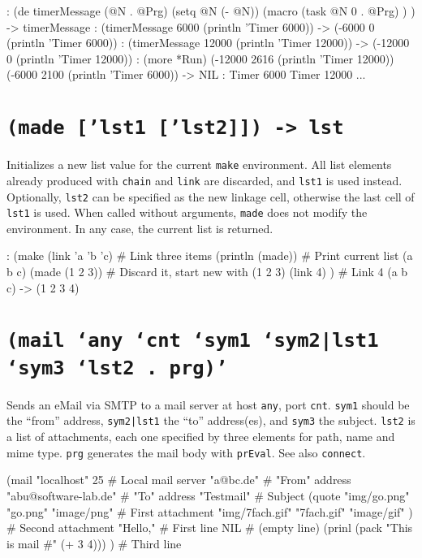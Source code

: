 \begin{wideverbatim}
: (de timerMessage (@N . @Prg)
   (setq @N (- @N))
   (macro
      (task @N 0 . @Prg) ) )
-> timerMessage
: (timerMessage 6000 (println 'Timer 6000))
-> (-6000 0 (println 'Timer 6000))
: (timerMessage 12000 (println 'Timer 12000))
-> (-12000 0 (println 'Timer 12000))
: (more *Run)
(-12000 2616 (println 'Timer 12000))
(-6000 2100 (println 'Timer 6000))
-> NIL
: Timer 6000
Timer 12000
...
\end{wideverbatim}

 
\section*{\texttt{(made ['lst1 ['lst2]]) -> lst}}
\label{sec:func-ref-M-(made ['lst1 ['lst2]]) -> lst}


Initializes a new list value for the current \texttt{make} environment. All
list elements already produced with \texttt{chain} and \texttt{link} are discarded,
and \texttt{lst1} is used instead. Optionally, \texttt{lst2} can be specified as the
new linkage cell, otherwise the last cell of \texttt{lst1} is used. When called
without arguments, \texttt{made} does not modify the environment. In any case,
the current list is returned.


\begin{wideverbatim}
: (make
   (link 'a 'b 'c)         # Link three items
   (println (made))        # Print current list (a b c)
   (made (1 2 3))          # Discard it, start new with (1 2 3)
   (link 4) )              # Link 4
(a b c)
-> (1 2 3 4)
\end{wideverbatim}

 
\section*{\texttt{(mail `any `cnt `sym1 `sym2|lst1 `sym3 `lst2 . prg)'}}
\label{sec:func-ref-M-(mail `any `cnt `sym1 `sym2|lst1 `sym3 `lst2 . prg)'}

Sends an eMail via SMTP to a mail server at host \texttt{any}, port \texttt{cnt}.
\texttt{sym1} should be the ``from'' address, \texttt{sym2|lst1} the ``to'' address(es),
and \texttt{sym3} the subject. \texttt{lst2} is a list of attachments, each one
specified by three elements for path, name and mime type. \texttt{prg}
generates the mail body with \texttt{prEval}. See also \texttt{connect}.


\begin{wideverbatim}
(mail "localhost" 25                               # Local mail server
   "a@bc.de"                                       # "From" address
   "abu@software-lab.de"                           # "To" address
   "Testmail"                                      # Subject
   (quote
      "img/go.png" "go.png" "image/png"            # First attachment
      "img/7fach.gif" "7fach.gif" "image/gif" )    # Second attachment
   "Hello,"                                        # First line
   NIL                                             # (empty line)
   (prinl (pack "This is mail #" (+ 3 4))) )       # Third line
\end{wideverbatim}

